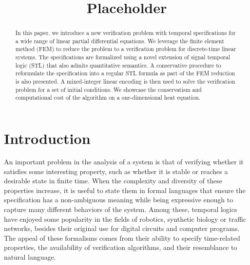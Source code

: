 \documentclass[oribibl]{llncs/llncs}
\title{Placeholder}
\begin{document}
\maketitle

\begin{abstract}


    In this paper, we introduce a new verification problem with temporal
    specifications for a wide range of linear partial differential equations. 
    We leverage the finite
    element method (FEM) to reduce the problem to a verification problem for
    discrete-time linear systems. The specifications are formalized using a
    novel extension of signal temporal logic (STL) that also admits quantitative
    semantics. A conservative procedure to reformulate the specification into a
    regular STL formula as part of the FEM reduction is also presented. A
    mixed-integer linear encoding is then used to solve the verification problem
    for a set of initial conditions.
    We showcase the conservatism and computational cost of the algorithm on a
    one-dimensional heat equation.

\end{abstract}

\section{Introduction}
\label{sec:introduction}

An important problem in the analysis of a system is
that of verifying whether it satisfies some interesting property, such as whether
it is stable or reaches a desirable state in finite time. When the complexity
and diversity of these properties increase, it is useful to state them in
formal languages  that ensure the specification has a
non-ambiguous meaning while being expressive enough to capture many different
behaviors of the system. Among these, temporal logics have enjoyed some
popularity in the fields of robotics, synthetic biology or traffic networks,
besides their original use for digital circuits and computer programs. The
appeal of these formalisms comes from their ability to specify time-related
properties, the availability of verification algorithms, and their resemblance
to natural language.
\end{document}
